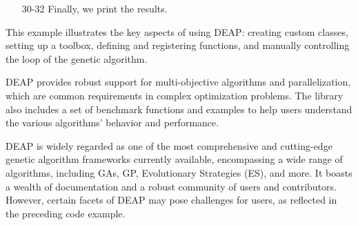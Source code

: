 \begin{enumerate}
      \begin{enumerate}
        \item[21-22] We apply crossover and mutation to the population using the
          \texttt{varAnd} function,\footnote{This function simply applies the
          variation operators to the population.} and then evaluate the fitness
          of the offspring
        \item[23-24] We assign the newly computed fitness values to the
          individuals.
        \item[25] We replace the old population with the selected individuals
          from the offspring.
        \item[26-27] We update the Hall of Fame and compile the statistics.
        \item[28-29] We check if the maximum fitness has reached the target
          fitness.
          If it has, we break the loop and the algorithm stops.
      \end{enumerate}

    \item[30-32] Finally, we print the results.
  \end{enumerate}

  This example illustrates the key aspects of using DEAP: creating custom
  classes, setting up a toolbox, defining and registering functions, and
  manually controlling the loop of the genetic algorithm.

  DEAP provides robust support for multi-objective algorithms and
  parallelization, which are common requirements in complex optimization
  problems.
  The library also includes a set of benchmark functions and examples to help
  users understand the various algorithms' behavior and performance.

  DEAP is widely regarded as one of the most comprehensive and cutting-edge
  genetic algorithm frameworks currently available, encompassing a wide range of
  algorithms, including GAs, GP, Evolutionary Strategies (ES), and more.
  It boasts a wealth of documentation and a robust community of users and
  contributors.
  However, certain facets of DEAP may pose challenges for users, as reflected in
  the preceding code example.

